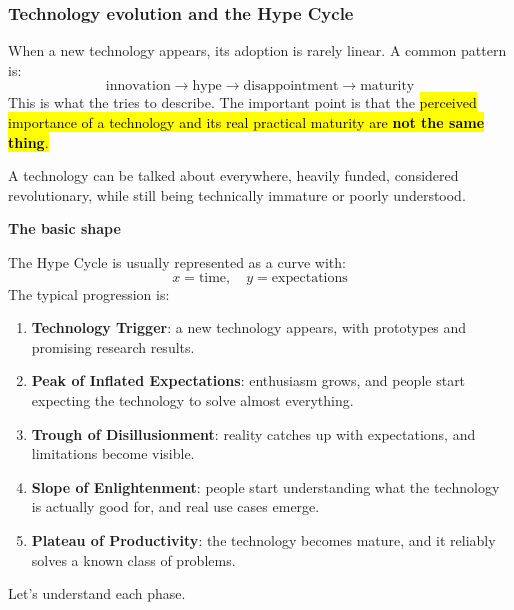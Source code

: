 \subsubsection{Technology evolution and the Hype Cycle}\label{subsubsec:big-data--big-data--big-data-landscape-and-the-data-driven-value-cycle--technology-evolution-and-the-hype-cycle}

When a new technology appears, its adoption is rarely linear. A common pattern is:
\begin{equation*}
    \text{innovation}
    \rightarrow
    \text{hype}
    \rightarrow
    \text{disappointment}
    \rightarrow
    \text{maturity}
\end{equation*}
This is what the  tries to describe. The important point is that the \hl{perceived importance of a technology and its real practical maturity are \textbf{not the same thing}.}

\highspace
A technology can be talked about everywhere, heavily funded, considered revolutionary, while still being technically immature or poorly understood.

\highspace
\begin{flushleft}
    \textcolor{Green3}{ \textbf{The basic shape}}
\end{flushleft}
The Hype Cycle is usually represented as a curve with:
\begin{equation*}
    x = \text{time}, \quad y = \text{expectations}
\end{equation*}
The typical progression is:
\begin{enumerate}
    \item \textbf{Technology Trigger}: a new technology appears, with prototypes and promising research results.
    \item \textbf{Peak of Inflated Expectations}: enthusiasm grows, and people start expecting the technology to solve almost everything.
    \item \textbf{Trough of Disillusionment}: reality catches up with expectations, and limitations become visible.
    \item \textbf{Slope of Enlightenment}: people start understanding what the technology is actually good for, and real use cases emerge.
    \item \textbf{Plateau of Productivity}: the technology becomes mature, and it reliably solves a known class of problems.
\end{enumerate}
Let's understand each phase.

